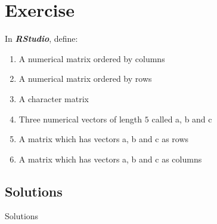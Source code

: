 \documentclass[
]{book}
\providecommand{\tightlist}{%
  \setlength{\itemsep}{0pt}\setlength{\parskip}{0pt}}
\begin{document}
\section{Exercise}\label{exercise-3}

In \textbf{\emph{RStudio}}, define:

\begin{enumerate}
\def\labelenumi{\arabic{enumi}.}
\tightlist
\item
  A numerical matrix ordered by columns
\item
  A numerical matrix ordered by rows
\item
  A character matrix
\item
  Three numerical vectors of length \(5\) called a, b and c
\item
  A matrix which has vectors a, b and c as rows
\item
  A matrix which has vectors a, b and c as columns
\end{enumerate}

\subsection{Solutions}\label{solutions-3}

Solutions
\end{document}
